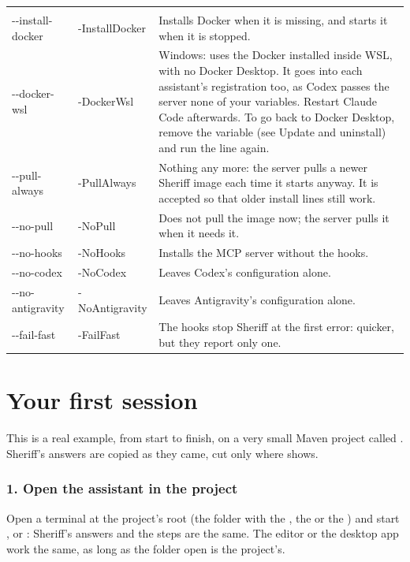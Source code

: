 \documentclass[11pt,a4paper]{article}
\begin{document}
\begin{center}
\begin{tabularx}{\linewidth}{@{\hspace{6pt}}>{\ttfamily\small}p{31mm}>{\ttfamily\small}p{26mm}L}
\headrow {} &  &  \\
-{}-install-docker & -InstallDocker & Installs Docker when it is missing, and
  starts it when it is stopped. \\
-{}-docker-wsl & -DockerWsl & Windows: uses the Docker installed inside WSL, with no Docker
  Desktop. It goes into each assistant's registration too, as Codex passes the
  server none of your variables. Restart Claude Code afterwards. To go back to
  Docker Desktop, remove the variable (see Update and uninstall) and run the line again. \\
-{}-pull-always & -PullAlways & Nothing any more: the server pulls a newer
  Sheriff image each time it starts anyway. It is accepted so that older install
  lines still work. \\
-{}-no-pull & -NoPull & Does not pull the image now; the server pulls it when
  it needs it. \\
-{}-no-hooks & -NoHooks & Installs the MCP server without the hooks. \\
-{}-no-codex & -NoCodex & Leaves Codex's configuration alone. \\
-{}-no-antigravity & -NoAntigravity & Leaves Antigravity's configuration alone. \\
-{}-fail-fast & -FailFast & The hooks stop Sheriff at the first error: quicker,
  but they report only one. \\
\end{tabularx}
\end{center}

\section{Your first session}
\label{sec:first}

This is a real example, from start to finish, on a very small Maven project
called . Sheriff's answers are copied as they came, cut only where
\code{[...]} shows.

\subsubsection{1. Open the assistant in the project}
Open a terminal at the project's root (the folder with the , the
 or the ) and start ,  or
: Sheriff's answers and the steps are the same. The editor or
the desktop app work the same, as long as the folder open is the project's.
\end{document}
